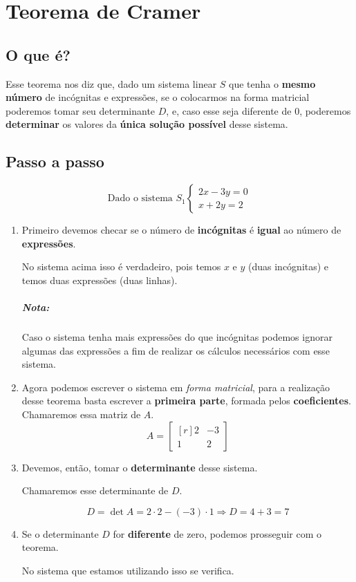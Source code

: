 \chapter{Teorema de Cramer}
\label{chap:cram}

\section{O que é?}

Esse teorema nos diz que, dado um sistema linear $S$ que tenha o \textbf{mesmo número} de incógnitas e expressões, se o colocarmos na forma matricial poderemos tomar seu determinante $D$, e, caso esse seja diferente de $0$, poderemos \textbf{determinar} os valores da \textbf{única solução possível} desse sistema.

\section{Passo a passo}

$$
\text{Dado o sistema }S_1\begin{cases}
2x-3y=0\\
x+2y=2
\end{cases}
$$

\begin{enumerate}
    \item Primeiro devemos checar se o número de \textbf{incógnitas} é \textbf{igual} ao número de \textbf{expressões}.
    
    No sistema acima isso é verdadeiro, pois temos $x$ e $y$ (duas incógnitas) e temos duas expressões (duas linhas). \checkmark
    
    \paragraph{Nota:}
    Caso o sistema tenha mais expressões do que incógnitas podemos ignorar algumas das expressões a fim de realizar os cálculos necessários com esse sistema.
    
    \item Agora podemos escrever o sistema em \textit{forma matricial}, para a realização desse teorema basta escrever a \textbf{primeira parte}, formada pelos \textbf{coeficientes}. Chamaremos essa matriz de $A$.
    $$
    A=\begin{bmatrix*}[r]
    2 & -3\\
    1 & 2
    \end{bmatrix*}
    $$

    \item Devemos, então, tomar o \textbf{determinante} desse sistema. 
    
    Chamaremos esse determinante de $D$.
    
    $$
    D=\det A=2\cdot 2-(-3)\cdot 1\Rightarrow D=4+3=7
    $$
    
    \item Se o determinante $D$ for \textbf{diferente} de zero, podemos prosseguir com o teorema.
    
    No sistema que estamos utilizando isso se verifica. \checkmark
\end{enumerate}

